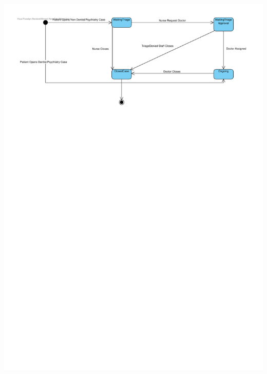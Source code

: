 \documentclass[a4paper, 12pt, titlepage]{article}
\begin{document}
  \includegraphics[width=\linewidth]{state_diag_case}
\end{document}
